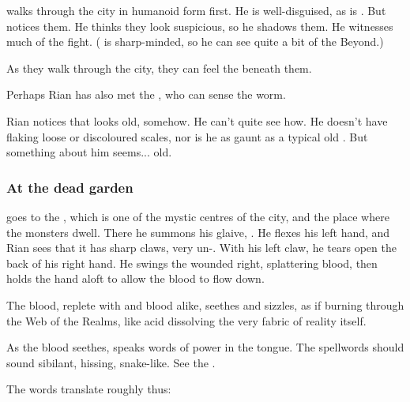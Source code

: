 \begin{garbage}
\Ishnaruchaefir{} walks through the city in humanoid form first. He is well-disguised, as is \Criseis. But  notices them. He thinks they look suspicious, so he shadows them. He witnesses much of the fight. ( is sharp-minded, so he can see quite a bit of the Beyond.)

As they walk through the city, they can feel the \ghobaleth{} beneath them. 


Perhaps Rian has also met the , who can sense the \ghobal{} worm.

Rian notices that \Ishnaruchaefir{} looks old, somehow. 
He can't quite see how. 
He doesn't have flaking loose or discoloured scales, nor is he as gaunt as a typical old \scatha. 
But something about him seems... old. 





\subsubsection{At the dead garden}
\Ishnaruchaefir{} goes to the , which is one of the mystic centres of the city, and the place where the monsters dwell. There he summons his glaive, \Triestessakhin. He flexes his left hand, and Rian sees that it has sharp claws, very un-\scathaese. With his left claw, he tears open the back of his right hand. He swings the wounded right, splattering blood, then holds the hand aloft to allow the blood to flow down. 

The \draconian{} blood, replete with \ophidian{} and \xzaishannic{} blood alike, seethes and sizzles, as if burning through the Web of the Realms, like acid dissolving the very fabric of reality itself. 

As the blood seethes, \Ishnaruchaefir{} speaks words of power in the \Draconic{} tongue. The \Draconic{} spellwords should sound sibilant, hissing, snake-like. See the . 

The words translate roughly thus:


\end{garbage}
